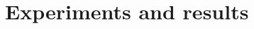 \documentclass{article}
\begin{document}


\section{Experiments and results}
\label{sec:exprm}

\end{document}
